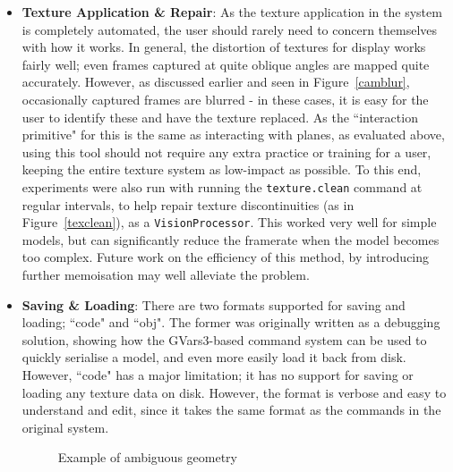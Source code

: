 \documentclass[a4paper,10pt]{article}
\begin{document}
\begin{itemize}
\item{\textbf{Texture Application \& Repair}: As the texture application in the system is completely automated, the user should rarely need to concern themselves with how it works. In general, the distortion of textures for display works fairly well; even frames captured at quite oblique angles are mapped quite accurately. However, as discussed earlier and seen in Figure~\ref{camblur}, occasionally captured frames are blurred - in these cases, it is easy for the user to identify these and have the texture replaced. As the ``interaction primitive" for this is the same as interacting with planes, as evaluated above, using this tool should not require any extra practice or training for a user, keeping the entire texture system as low-impact as possible. To this end, experiments were also run with running the \texttt{texture.clean} command at regular intervals, to help repair texture discontinuities (as in Figure~\ref{texclean}), as a \texttt{VisionProcessor}. This worked very well for simple models, but can significantly reduce the framerate when the model becomes too complex. Future work on the efficiency of this method, by introducing further memoisation may well alleviate the problem.
}

\item{\textbf{Saving \& Loading}: There are two formats supported for saving and loading; ``code" and ``obj". The former was originally written as a debugging solution, showing how the GVars3-based command system can be used to quickly serialise a model, and even more easily load it back from disk. However, ``code" has a major limitation; it has no support for saving or loading any texture data on disk. However, the format is verbose and easy to understand and edit, since it takes the same format as the commands in the original system.

\begin{figure}[t]
    \quad
    \caption{Example of ambiguous geometry}
    \label{geoambig}
\end{figure}

}
\end{itemize}
\end{document}

